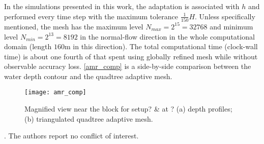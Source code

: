 \documentclass{jfm}
\begin{document}
In the simulations presented in this work, the adaptation  is associated with $h $ and performed every time step with the  maximum tolerance $\frac{1}{150}H$. Unless specifically mentioned, the mesh has the maximum level $N_{max}=2^{15}=32768$ and minimum level $N_{min}=2^{13}=8192$ in the normal-flow direction in the whole computational domain (length $160$m in this direction). The total computational time (clock-wall time) is about one fourth of that spent using globally refined mesh while without observable accuracy loss. \autoref{amr_comp} is a side-by-side comparison between the water depth contour and the quadtree adaptive mesh.


\begin{figure}
	\centerline{\texttt{[image: amr\_comp]}}
	\caption{Magnified view near the block for setup? \& at ? (a) depth profiles; (b) triangulated quadtree adaptive mesh.}
	\label{amr_comp}
\end{figure}




. The authors report no conflict of interest. \\



\end{document}
